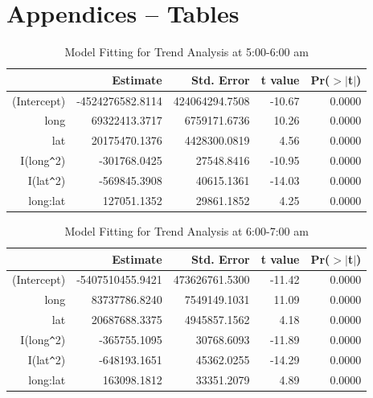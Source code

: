 \documentclass[hidelinks,12pt]{article}
\begin{document}
	\section{Appendices -- Tables} \label{sec:appb}
	\begin{table}[!ht]
		\centering
		\caption{Model Fitting for Trend Analysis at 5:00-6:00 am \label{tbl:trend5}}
		\begin{tabular}{rrrrr}
			\hline
			& Estimate & Std. Error & t value & Pr($>$$|$t$|$) \\ 
			\hline
			(Intercept) & -4524276582.8114 & 424064294.7508 & -10.67 & 0.0000 \\ 
			long & 69322413.3717 & 6759171.6736 & 10.26 & 0.0000 \\ 
			lat & 20175470.1376 & 4428300.0819 & 4.56 & 0.0000 \\ 
			I(long\verb|^|2) & -301768.0425 & 27548.8416 & -10.95 & 0.0000 \\ 
			I(lat\verb|^|2) & -569845.3908 & 40615.1361 & -14.03 & 0.0000 \\ 
			long:lat & 127051.1352 & 29861.1852 & 4.25 & 0.0000 \\ 
			\hline
		\end{tabular}
	\end{table}
	\begin{table}[!ht]
		\centering
		\caption{Model Fitting for Trend Analysis at 6:00-7:00 am \label{tbl:trend6}}
		\begin{tabular}{rrrrr}
			\hline
			& Estimate & Std. Error & t value & Pr($>$$|$t$|$) \\ 
			\hline
			(Intercept) & -5407510455.9421 & 473626761.5300 & -11.42 & 0.0000 \\ 
			long & 83737786.8240 & 7549149.1031 & 11.09 & 0.0000 \\ 
			lat & 20687688.3375 & 4945857.1562 & 4.18 & 0.0000 \\ 
			I(long\verb|^|2) & -365755.1095 & 30768.6093 & -11.89 & 0.0000 \\ 
			I(lat\verb|^|2) & -648193.1651 & 45362.0255 & -14.29 & 0.0000 \\ 
			long:lat & 163098.1812 & 33351.2079 & 4.89 & 0.0000 \\ 
			\hline
		\end{tabular}
	\end{table}
\end{document}
